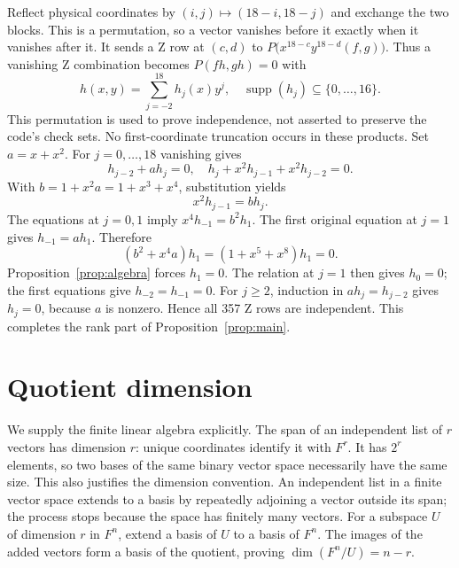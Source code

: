 \documentclass{article}
\DeclareMathOperator{\supp}{supp}
\begin{document}
Reflect physical coordinates by \((i,j) \mapsto (18 - i, 18 - j)\) and
exchange the two blocks. This is a permutation, so a vector vanishes before it
exactly when it vanishes after it. It sends a Z row at \((c,d)\) to
\(P\bigl(x^{18-c} y^{18-d} (f, g)\bigr)\). Thus a vanishing Z combination
becomes \(P(fh, gh) = 0\) with
\begin{equation}
  h(x,y) = \sum_{j=-2}^{18} h_j(x) y^j, \quad
  \supp(h_j) \subseteq \{0, \dots, 16\}.
\end{equation}
This permutation is used to prove independence, not asserted to preserve the
code's check sets. No first-coordinate truncation occurs in these products.
Set \(a = x + x^2\). For \(j = 0, \dots, 18\) vanishing gives
\begin{equation}
  h_{j-2} + a h_j = 0, \quad h_j + x^2 h_{j-1} + x^2 h_{j-2} = 0.
\end{equation}
With \(b = 1 + x^2 a = 1 + x^3 + x^4\), substitution yields
\begin{equation}
  x^2 h_{j-1} = b h_j.
\end{equation}
The equations at \(j = 0, 1\) imply \(x^4 h_{-1} = b^2 h_1\). The first
original equation at \(j = 1\) gives \(h_{-1} = a h_1\). Therefore
\begin{equation}
  (b^2 + x^4 a) h_1 = (1 + x^5 + x^8) h_1 = 0.
\end{equation}
Proposition~\ref{prop:algebra} forces \(h_1 = 0\). The relation at \(j = 1\) then
gives \(h_0 = 0\); the first equations give \(h_{-2} = h_{-1} = 0\). For
\(j \ge 2\), induction in \(a h_j = h_{j-2}\) gives \(h_j = 0\), because \(a\)
is nonzero. Hence all 357 Z rows are independent. This completes the rank part
of Proposition~\ref{prop:main}.

\section{Quotient dimension}\label{sec:quotient}

We supply the finite linear algebra explicitly. The span of an independent
list of \(r\) vectors has dimension \(r\): unique coordinates identify it with
\(F^r\). It has \(2^r\) elements, so two bases of the same binary vector space
necessarily have the same size. This also justifies the dimension convention.
An independent list in a finite vector space extends to a basis by repeatedly
adjoining a vector outside its span; the process stops because the space has
finitely many vectors. For a subspace \(U\) of dimension \(r\) in \(F^n\),
extend a basis of \(U\) to a basis of \(F^n\). The images of the added vectors
form a basis of the quotient, proving \(\dim(F^n/U) = n - r\).
\end{document}
